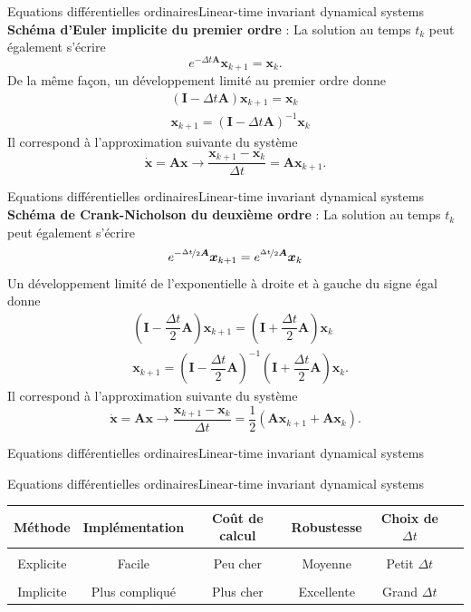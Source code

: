 \documentclass[usenames,dvipsnames,svgnames,10pt,aspectratio=169]{beamer}
\begin{document}
\begin{frame}[t, c]{Equations différentielles ordinaires}{Linear-time invariant dynamical systems}
  \alert{\textbf{Schéma d'Euler implicite du premier ordre}} : La solution au temps $t_k$ peut également s'écrire
    \[
    e^{-\Delta t \bm{A}} \bm{x}_{k+1} = \bm{x}_k.
    \]
    De la même façon, un développement limité au premier ordre donne
    \[
    \begin{aligned}
      & \left( \bm{I} - \Delta t \bm{A} \right) \bm{x}_{k+1} = \bm{x}_k \\
      & \bm{x}_{k+1} = \left( \bm{I} - \Delta t \bm{A} \right)^{-1} \bm{x}_k
    \end{aligned}
    \]
    Il correspond à l'approximation suivante du système
    \[
    \dot{\bm{x}} = \bm{Ax} \to \dfrac{\bm{x}_{k+1} - \bm{x}_k}{\Delta t} = \bm{Ax}_{k+1}.
    \]
\end{frame}

\begin{frame}[t, c]{Equations différentielles ordinaires}{Linear-time invariant dynamical systems}
  \alert{\textbf{Schéma de Crank-Nicholson du deuxième ordre}} : La solution au temps $t_k$ peut également s'écrire
  \[
  e^{-\nicefrac{\Delta t}{2} \bm{A}} \bm{x}_{k+1} = e^{\nicefrac{\Delta t}{2} \bm{A}} \bm{x}_{k}
  \]
  Un développement limité de l'exponentielle à droite et à gauche du signe égal donne
  \[
  \begin{aligned}
    & \left( \bm{I} - \dfrac{\Delta t}{2} \bm{A} \right) \bm{x}_{k+1} = \left( \bm{I} + \dfrac{\Delta t}{2} \bm{A} \right) \bm{x}_k \\
    & \bm{x}_{k+1} = \left( \bm{I} - \dfrac{\Delta t}{2} \bm{A} \right)^{-1} \left( \bm{I} + \dfrac{\Delta t}{2} \bm{A} \right) \bm{x}_k.
  \end{aligned}
  \]
  Il correspond à l'approximation suivante du système
  \[
  \dot{\bm{x}} = \bm{Ax} \to \dfrac{\bm{x}_{k+1} - \bm{x}_k}{\Delta t} = \dfrac{1}{2} \left( \bm{Ax}_{k+1} + \bm{Ax}_k \right).
  \]
\end{frame}

\begin{frame}[t, c]{Equations différentielles ordinaires}{Linear-time invariant dynamical systems}
  
\end{frame}

\begin{frame}[t, c]{Equations différentielles ordinaires}{Linear-time invariant dynamical systems}
  \centering
  \begin{tabular}{c|ccccc}
    Méthode & Implémentation & Coût de calcul & Robustesse & Choix de $\Delta t$ \\
    \hline
    \hline \\
    Explicite & {\color{green}Facile} & {\color{green} Peu cher} & {\color{red} Moyenne} & {\color{orange} Petit $\Delta t$}
    \\
    \\
    Implicite & {\color{orange} Plus compliqué} & {\color{orange} Plus cher} & {\color{green} Excellente} & {\color{green} Grand $\Delta t$}
  \end{tabular}
\end{frame}
\end{document}
